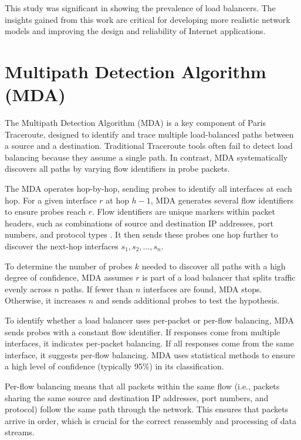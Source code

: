 \documentclass[12pt]{cwru_thesis}
\begin{document}
This study was significant in showing the prevalence of load balancers. The insights gained from this work are critical for developing more realistic network models and improving the design and reliability of Internet applications.



\section{Multipath Detection Algorithm (MDA)}

The Multipath Detection Algorithm (MDA) is a key component of Paris Traceroute, designed to identify and trace multiple load-balanced paths between a source and a destination. Traditional Traceroute tools often fail to detect load balancing because they assume a single path. In contrast, MDA systematically discovers all paths by varying flow identifiers in probe packets.

The MDA operates hop-by-hop, sending probes to identify all interfaces at each hop. For a given interface \(r\) at hop \(h-1\), MDA generates several flow identifiers to ensure probes reach \(r\). Flow identifiers are unique markers within packet headers, such as combinations of source and destination IP addresses, port numbers, and protocol types . It then sends these probes one hop further to discover the next-hop interfaces \(s_1, s_2, \ldots, s_n\).

To determine the number of probes \(k\) needed to discover all paths with a high degree of confidence, MDA assumes \(r\) is part of a load balancer that splits traffic evenly across \(n\) paths. If fewer than \(n\) interfaces are found, MDA stops. Otherwise, it increases \(n\) and sends additional probes to test the hypothesis.

To identify whether a load balancer uses per-packet or per-flow balancing, MDA sends probes with a constant flow identifier. If responses come from multiple interfaces, it indicates per-packet balancing. If all responses come from the same interface, it suggests per-flow balancing. MDA uses statistical methods to ensure a high level of confidence (typically 95\%) in its classification.

Per-flow balancing means that all packets within the same flow (i.e., packets sharing the same source and destination IP addresses, port numbers, and protocol) follow the same path through the network. This ensures that packets arrive in order, which is crucial for the correct reassembly and processing of data streams.
\end{document}
